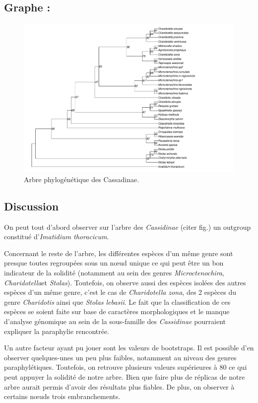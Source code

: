 \documentclass[a4paper, 12pt]{article}
\begin{document}
\subsection{Graphe :}

\begin{figure}[H]
    \centering
    \includegraphics[width=1.3\textwidth]{final_cassi.pdf}
    \caption{\small Arbre phylogénétique des Cassadinae.}
    \label{Cassi_tree}
\end{figure}

\subsection{Discussion}

On peut tout d’abord observer sur l’arbre des \emph{Cassidinae} (citer fig.) un outgroup constitué d’\emph{Imatidium thoracicum}.


Concernant le reste de l’arbre, les différentes espèces d’un même genre sont presque toutes regroupées sous un nœud unique ce qui peut être un bon indicateur de la solidité (notamment au sein des genres \emph{Microctenochira}, \emph{Charidotella}et \emph{Stolas}). Toutefois, on observe aussi des espèces isolées des autres espèces d’un même genre, c’est le cas de \emph{Charidotella zona}, des 2 espèces du genre \emph{Charidotis} ainsi que \emph{Stolas lebasii}. Le fait que la classification de ces espèces se soient faite sur base de caractères morphologiques et le manque d’analyse génomique au sein de la sous-famille des \emph{Cassidinae} pourraient expliquer la paraphylie rencontrée.


Un autre facteur ayant pu jouer sont les valeurs de bootstraps. Il est possible d’en observer quelques-unes un peu plus faibles, notamment au niveau des genres paraphylétiques. Toutefois, on retrouve plusieurs valeurs supérieures à 80 ce qui peut appuyer la solidité de notre arbre. Bien que faire plus de réplicas de notre arbre aurait permis d’avoir des résultats plus fiables. De plus, on observer à certains nœuds trois embranchements.
\end{document}
